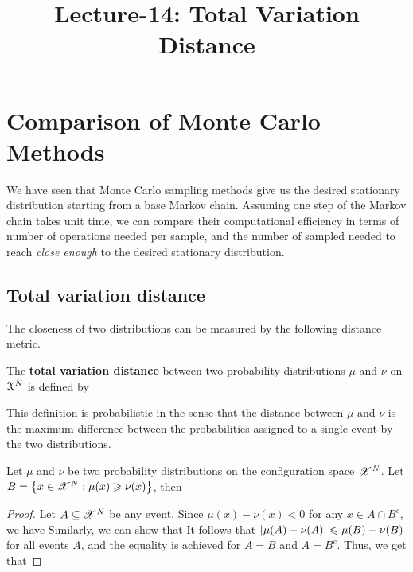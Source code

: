 \documentclass[letterpaper,english,10pt]{article}
\title{Lecture-14: Total Variation Distance}
\begin{document}
\maketitle

\section{Comparison of Monte Carlo Methods}
We have seen that Monte Carlo sampling methods give us the desired stationary distribution starting from a base Markov chain. 
Assuming one step of the Markov chain takes unit time, 
we can compare their computational efficiency in terms of number of operations needed per sample,  
and the number of sampled needed to reach \textit{close enough} to the desired stationary distribution. 

\subsection{Total variation distance}
The closeness of two distributions can be measured by the following distance metric.
\begin{defn}
The \textbf{total variation distance} between two probability distributions $\mu$ and $\nu$ on $\mathcal{X}^N$ is defined by
\end{defn}
This definition is probabilistic in the sense that the distance between $\mu$ and $\nu$ is the maximum difference between the probabilities assigned to a single event by the two distributions. 
\begin{prop}
Let $\mu$ and $\nu$ be two probability distributions on the configuration space $\mathscr{X}^N$. 
Let $B = \left\{x \in \mathscr{X}^N: \mu(x) \geqslant \nu(x)\right\}$, then 
\end{prop}
\begin{proof}
Let $A \subseteq \mathscr{X}^N$ be any event. 
Since $\mu(x)  - \nu(x) < 0$ for any $x \in A\cap B^c$, we have 
Similarly, we can show that 
It follows that $\left\lvert\mu(A)-\nu(A)\right\rvert \leqslant  \mu(B) - \nu(B)$ for all events $A$, 
and the equality is achieved for $A = B$ and $A = B^c$. 
Thus, we get that 
\end{proof}
\end{document}
